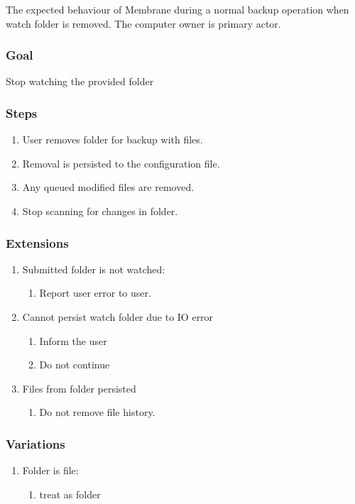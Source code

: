 \documentclass[11pt, a4paper, twoside]{report}
\begin{document}
The expected behaviour of Membrane during a normal backup operation when watch folder is removed. The computer owner is primary actor.

\subsubsection{Goal}

Stop watching the provided folder

\subsubsection{Steps}

\begin{enumerate}
 \item User removes folder for backup with files.
 \item Removal is persisted to the configuration file.
 \item Any queued modified files are removed.
 \item Stop scanning for changes in folder.
\end{enumerate}

\subsubsection{Extensions}
\begin{enumerate}
  \item Submitted folder is not watched:
	\begin{enumerate}
	  \item Report user error to user.
	\end{enumerate}
  \item Cannot persist watch folder due to IO error
	\begin{enumerate}
	  \item Inform the user
	  \item Do not continue
	\end{enumerate}
  \item Files from folder persisted
	\begin{enumerate}
	  \item Do not remove file history.
	\end{enumerate}
\end{enumerate}


\subsubsection{Variations}
\begin{enumerate}
  \item Folder is file:
	\begin{enumerate}
	  \item treat as folder
	\end{enumerate}
\end{enumerate}
\end{document}
